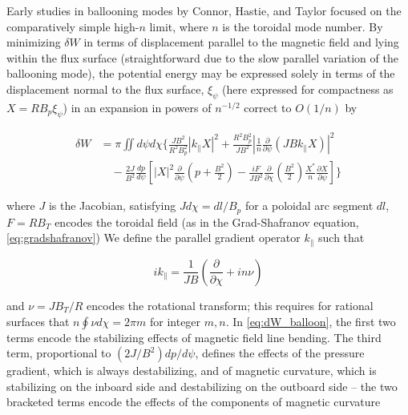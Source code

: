 Early studies in ballooning modes by Connor, Hastie, and Taylor \cite{Connor1978,Connor1979} focused on the comparatively simple high-$n$ limit, where $n$ is the toroidal mode number.  By minimizing $\delta W$ in terms of displacement parallel to the magnetic field and lying within the flux surface (straightforward due to the slow parallel variation of the ballooning mode), the potential energy may be expressed solely in terms of the displacement normal to the flux surface, $\xi_\psi$ (here expressed for compactness as $X = RB_p \xi_\psi$) in an expansion in powers of $n^{-1/2}$ correct to $O(1/n)$ by

\begin{equation}\label{eq:dW_balloon}
 \begin{aligned}
  \delta W &= \pi \iint d\psi d\chi \Bigg\{ \frac{JB^2}{R^2 B_p^2} \left| k_\parallel X \right|^2 + \frac{R^2 B_p^2}{JB^2} \left| \frac{1}{n} \frac{\partial}{\partial \psi} \left( JB k_\parallel X \right) \right|^2\\
  &\quad- \frac{2J}{B^2} \frac{dp}{d\psi} \left[ \left| X \right|^2 \frac{\partial}{\partial \psi} \left( p + \frac{B^2}{2} \right) - \frac{iF}{JB^2} \frac{\partial}{\partial \chi} \left( \frac{B^2}{2} \right) \frac{X^*}{n} \frac{\partial X}{\partial \psi} \right] \Bigg\}
 \end{aligned}
\end{equation}

\noindent where $J$ is the Jacobian, satisfying $J d\chi = dl/B_p$ for a poloidal arc segment $dl$, $F = RB_T$ encodes the toroidal field (as in the Grad-Shafranov equation, \cref{eq:gradshafranov}) We define the parallel gradient operator $k_\parallel$ such that

\begin{equation}\label{eq:dW_kparallel}
  ik_\parallel = \frac{1}{JB} \left( \frac{\partial}{\partial \chi} + in \nu \right)
\end{equation}

\noindent and $\nu = JB_T/R$ encodes the rotational transform; this requires for rational surfaces that $n \oint \nu d\chi = 2\pi m$ for integer $m,n$.  In \cref{eq:dW_balloon}, the first two terms encode the stabilizing effects of magnetic field line bending.  The third term, proportional to $\left(2J/B^2\right) dp/d\psi$, defines the effects of the pressure gradient, which is always destabilizing, and of magnetic curvature, which is stabilizing on the inboard side and destabilizing on the outboard side -- the two bracketed terms encode the effects of the components of magnetic curvature

